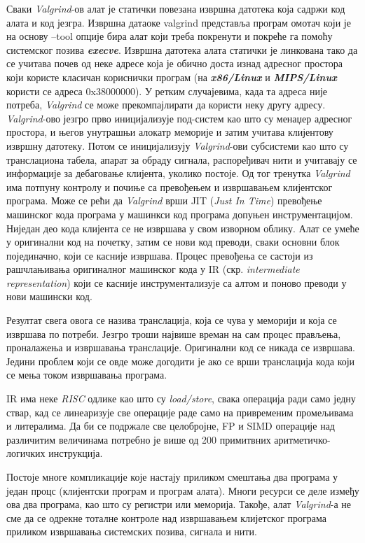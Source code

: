 \documentclass[12pt,oneside]{memoir}
\begin{document}
\indent Сваки \textit{Valgrind}-ов алат је статички повезана извршна датотека која садржи код алата и код језгра. Извршна датаоке valgrind представља програм омотач који је на основу --tool опције бира алат који треба покренути и покреће га помоћу системског позива \textbf{\textit{execve}}. Извршна датотека алата статички је линкована тако да се учитава почев од неке адресе која је обично доста изнад адресног простора који користе класичан кориснички програм (на \textbf{\textit{x86/Linux}} и \textbf{\textit{MIPS/Linux}} користи се адреса 0x38000000). У ретким случајевима, када та адреса није потреба, \textit{Valgrind} се може прекомпајлирати да користи неку другу адресу. \textit{Valgrind}-ово језгро прво иницијализује под-систем као што су менаџер адресног простора, и његов унутрашњи алокатр меморије и затим учитава клијентову извршну датотеку. Потом се иницијализују \textit{Valgrind}-ови субсистеми као што су транслациона табела, апарат за обраду сигнала, распоређивач нити и учитавају се информације за дебаговање клијента, уколико постоје. Од тог тренутка \textit{Valgrind} има потпуну контролу и почиње са превођењем и извршавањем клијентског програма. Може се рећи да \textit{Valgrind} врши JIT (\textit{Just In Time}) превођење машинског кода програма у машинкси код програма допуњен инструментацијом. Ниједан део кода клијента се не извршава у свом изворном облику. Алат се умеће у оригинални код на почетку, затим се нови код преводи, сваки основни блок појединачно, који се касније извршава. Процес превођења се састоји из рашчлањивања оригиналног машинског кода у IR (скр. \textit{intermediate representation}) који се касније инструментализује са алтом и поново преводи у нови машински код. 

\indent Резултат свега овога се назива транслација, која се чува у меморији и која се извршава по потреби. Језгро троши највише времан на сам процес прављења, проналажења и извршавања транслације. Оригинални код се никада се извршава. Једини проблем који се овде може догодити је ако се врши транслација кода који се мења током извршавања програма.

\indent IR има неке \textit{RISC} одлике као што су \textit{load/store}, свака операција ради само једну ствар, кад се линеаризује све операције раде само на привременим промељивама и литералима. Да би се подржале све целобројне, FP и SIMD операције над различитим величинама потребно је више од 200 примитвних аритметичко-логичких инструкција. 

\indent Постоје многе компликације које настају приликом смештања два програма у један процс (клијентски програм и програм алата). Многи ресурси се деле између ова два програма, као што су регистри или меморија. Такође, алат \textit{Valgrind}-а не сме да се одрекне тоталне контроле над извршавањем клијетског програма приликом извршавања системских позива, сигнала и нити.
\end{document}
